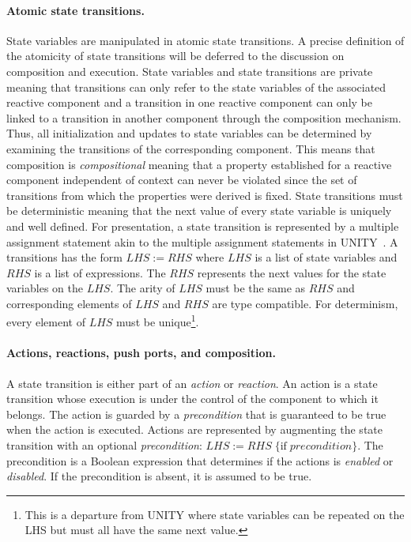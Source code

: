 \paragraph{Atomic state transitions.}
State variables are manipulated in atomic state transitions.
A precise definition of the atomicity of state transitions will be deferred to the discussion on composition and execution.
State variables and state transitions are private meaning that transitions can only refer to the state variables of the associated reactive component and a transition in one reactive component can only be linked to a transition in another component through the composition mechanism.
Thus, all initialization and updates to state variables can be determined by examining the transitions of the corresponding component.
This means that composition is \emph{compositional} meaning that a property established for a reactive component independent of context can never be violated since the set of transitions from which the properties were derived is fixed.
State transitions must be deterministic meaning that the next value of every state variable is uniquely and well defined.
For presentation, a state transition is represented by a multiple assignment statement akin to the multiple assignment statements in UNITY~\cite{chandy1989parallel}.
A transitions has the form $LHS := RHS$ where $LHS$ is a list of state variables and $RHS$ is a list of expressions.
The $RHS$ represents the next values for the state variables on the $LHS$.
The arity of $LHS$ must be the same as $RHS$ and corresponding elements of $LHS$ and $RHS$ are type compatible.
For determinism, every element of $LHS$ must be unique\footnote{This is a departure from UNITY where state variables can be repeated on the LHS but must all have the same next value.}.

\paragraph{Actions, reactions, push ports, and composition.}
A state transition is either part of an \emph{action} or \emph{reaction}.
An action is a state transition whose execution is under the control of the component to which it belongs.
The action is guarded by a \emph{precondition} that is guaranteed to be true when the action is executed.
Actions are represented by augmenting the state transition with an optional \emph{precondition}: $LHS := RHS \; \{ \mathrm{if} \; precondition \}$.
The precondition is a Boolean expression that determines if the actions is \emph{enabled} or \emph{disabled}.
If the precondition is absent, it is assumed to be true.

